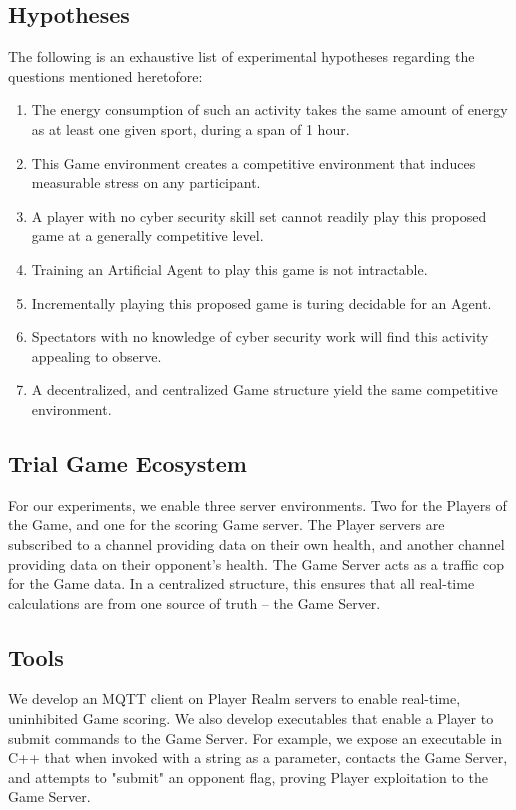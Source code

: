 \documentclass[10pt, titlepage, twocolumn]{article}
\newcommand{\ii}{\indent\indent}
\begin{document}
\subsection{Hypotheses}
The following is an exhaustive list of experimental hypotheses regarding the questions mentioned heretofore:

\begin{enumerate}
	\item The energy consumption of such an activity takes the same amount of energy as at least one given sport, during a span of 1 hour.
	\item This Game environment creates a competitive environment that induces measurable stress on any participant.
	\item A player with no cyber security skill set cannot readily play this proposed game at a generally competitive level.
	\item Training an Artificial Agent to play this game is not intractable.
	\item Incrementally playing this proposed game is turing decidable for an Agent.
	\item Spectators with no knowledge of cyber security work will find this activity appealing to observe.
	\item A decentralized, and centralized Game structure yield the same competitive environment.
\end{enumerate}


\subsection{Trial Game Ecosystem}
\ii
For our experiments, we enable three server environments. Two for the Players of the Game, and one for the scoring Game server. The Player servers are subscribed to a channel providing data on their own health, and another channel providing data on their opponent's health. The Game Server acts as a traffic cop for the Game data. In a centralized structure, this ensures that all real-time calculations are from one source of truth -- the Game Server.

\subsection{Tools}
\ii
We develop an MQTT client on Player Realm servers to enable real-time, uninhibited Game scoring. We also develop executables that enable a Player to submit commands to the Game Server. For example, we expose an executable in C++ that when invoked with a string as a parameter, contacts the Game Server, and attempts to "submit" an opponent flag, proving Player exploitation to the Game Server.
\end{document}
